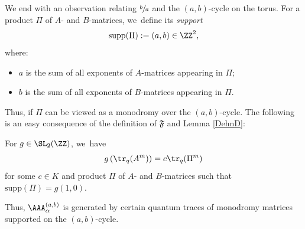 We end with an observation relating $\sfrac{b}{a}$ and the $(a,b)$-cycle on the torus.
For a product $\Pi$ of $A$- and $B$-matrices, we~define its \textit{support}
\[
\mathrm{supp}(\Pi):=(a,b)\in\ZZ^2,
\]
where:
\begin{itemize}
\item $a$ is the sum of all exponents of $A$-matrices appearing in $\Pi$;
\item $b$ is the sum of all exponents of $B$-matrices appearing in $\Pi$.
\end{itemize}
Thus, if $\Pi$ can be viewed as a monodromy over the $(a,b)$-cycle.
The following is an easy consequence of the definition of $\mathfrak{F}$ and Lemma \ref{DehnD}:

\begin{cor}
For $g\in \SL_2(\ZZ)$, we~have
\[
g\left(\tr_q(A^m) \right)=c\tr_q(\Pi^m)
\]
for some $c\in K$ and product $\Pi$ of $A$- and $B$-matrices such that $\mathrm{supp}(\Pi)=g(1,0)$.
\end{cor}
Thus, $\AAA_\alpha^{(a,b)}$ is generated by certain quantum traces of monodromy matrices supported on the $(a,b)$-cycle.
